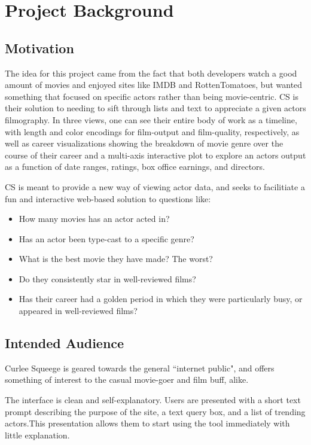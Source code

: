 \documentclass[12pt]{article}
\begin{document}
\newpage

\section{Project Background}

\subsection{Motivation}\label{sec:Motivation}
	The idea for this project came from the fact that both developers watch a good amount of movies and enjoyed sites like IMDB and RottenTomatoes, but wanted something that focused on specific actors rather than being movie-centric. CS is their solution to needing to sift through lists and text to appreciate a given actors filmography. In three views, one can see their entire body of work as a timeline, with length and color encodings for film-output and film-quality, respectively, as well as career visualizations showing the breakdown of movie genre over the course of their career and a multi-axis interactive plot to explore an actors output as a function of date ranges, ratings, box office earnings, and directors.
	
	CS is meant to provide a new way of viewing actor data, and seeks to facilitiate a fun and interactive web-based solution to questions like:


	\begin{itemize}
		\item How many movies has an actor acted in?
		\item Has an actor been type-cast to a specific genre?
		\item What is the best movie they have made? The worst?
		\item Do they consistently star in well-reviewed films?
		\item Has their career had a golden period in which they were particularly busy, or appeared in well-reviewed films?
	\end{itemize}
	
\subsection{Intended Audience}
Curlee Squeege is geared towards the general ``internet public", and offers something of interest to the casual movie-goer  and film buff, alike.  

The interface is clean and self-explanatory.  
Users are presented with a short text prompt describing the purpose of the site, a text query box, and a list of trending actors.This presentation allows them to start using the tool immediately with little explanation.
\end{document}
